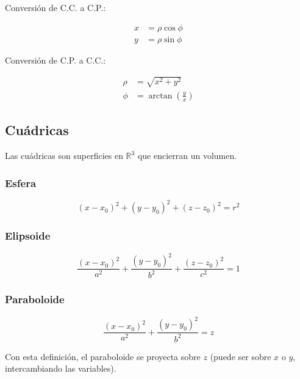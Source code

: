 \documentclass{article}
\renewcommand{\Bbb}{\mathbb}
\begin{document}
Conversión de C.C. a C.P.:

\begin{subequations}
\begin{align}
x & = \rho \cos \phi \\
y & = \rho \sin \phi
\end{align}
\end{subequations}

Conversión de C.P. a C.C.:

\begin{subequations}
\begin{align}
\rho & = \sqrt{x^2 + y^2} \\
\phi & = \arctan \left( \frac{y}{x} \right)
\end{align}
\end{subequations}

\subsection{Cuádricas}

Las cuádricas son superficies en $\Bbb R^3$ que encierran un volumen.

\subsubsection{Esfera}

\begin{equation}
(x-x_0)^2 + (y-y_0)^2 + (z-z_0)^2 = r^2
\end{equation}

\subsubsection{Elipsoide}

\begin{equation}
\frac{(x-x_0)^2}{a^2} + \frac{(y-y_0)^2}{b^2} + \frac{(z-z_0)^2}{c^2} = 1
\end{equation}

\subsubsection{Paraboloide}

\begin{equation}
\frac{(x-x_0)^2}{a^2} + \frac{(y-y_0)^2}{b^2} = z
\end{equation}

Con esta definición, el paraboloide se proyecta sobre $z$ (puede ser sobre $x$ o $y$, intercambiando las variables).
\end{document}
